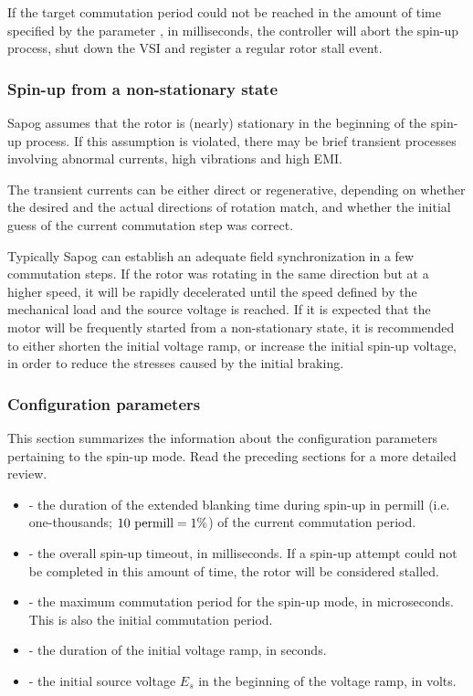 \documentclass{zubaxdoc}
\begin{document}
If the target commutation period could not be reached in the amount of time specified by
the parameter , in milliseconds, the controller will abort the spin-up process,
shut down the VSI and register a regular rotor stall event.

\subsubsection{Spin-up from a non-stationary state}

Sapog assumes that the rotor is (nearly) stationary in the beginning of the spin-up process.
If this assumption is violated, there may be brief transient processes involving abnormal currents,
high vibrations and high EMI.

The transient currents can be either direct or regenerative, depending on whether the desired
and the actual directions of rotation match, and whether the initial guess of the current
commutation step was correct.

Typically Sapog can establish an adequate field synchronization in a few commutation steps.
If the rotor was rotating in the same direction but at a higher speed,
it will be rapidly decelerated until the speed defined by the mechanical load and the source voltage is
reached.
If it is expected that the motor will be frequently started from a non-stationary state,
it is recommended to either shorten the initial voltage ramp, or increase the initial
spin-up voltage, in order to reduce the stresses caused by the initial braking.

\subsubsection{Configuration parameters}

This section summarizes the information about the configuration parameters pertaining to the spin-up mode.
Read the preceding sections for a more detailed review.

\begin{itemize}
	\item {} - the duration of the extended blanking time during spin-up in permill
	(i.e. one-thousands; $10\text{\space{}permill} = 1\% $) of the current commutation period.
	\item {} - the overall spin-up timeout, in milliseconds.
	If a spin-up attempt could not be completed in this amount of time, the rotor will be considered stalled.
	\item {} - the maximum commutation period for the spin-up mode, in microseconds.
	This is also the initial commutation period.
	\item {} - the duration of the initial voltage ramp, in seconds.
	\item {} - the initial source voltage $E_s$ in the beginning of the voltage ramp, in volts.
\end{itemize}
\end{document}
